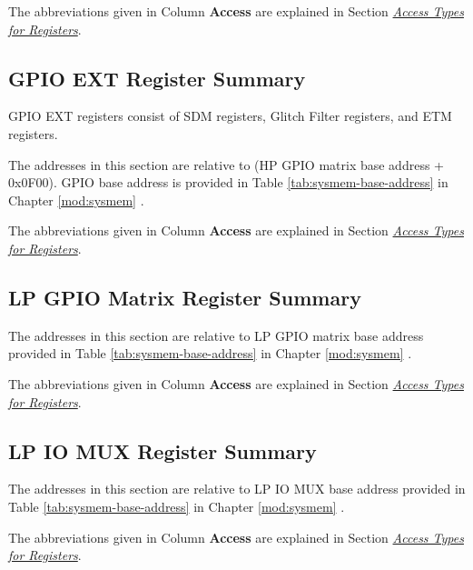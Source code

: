 \documentclass[main\_\_EN.tex]{subfiles}
\begin{document}
The abbreviations given in Column \textbf{Access} are explained in Section \hyperref[glossary-access-types]{\textit{Access Types for Registers}}.




\subsection{GPIO EXT Register Summary}

GPIO EXT registers consist of SDM registers, Glitch Filter registers, and ETM registers.

The addresses in this section are relative to (HP GPIO matrix base address + 0x0F00). GPIO base address is provided in Table \ref{tab:sysmem-base-address} in Chapter \ref{mod:sysmem} \textit{}.

The abbreviations given in Column \textbf{Access} are explained in Section \hyperref[glossary-access-types]{\textit{Access Types for Registers}}.



\subsection{LP GPIO Matrix Register Summary}
\label{sec:lp-gpio-register-summ}
The addresses in this section are relative to LP GPIO matrix base address provided in Table \ref{tab:sysmem-base-address} in Chapter \ref{mod:sysmem} \textit{}.

The abbreviations given in Column \textbf{Access} are explained in Section \hyperref[glossary-access-types]{\textit{Access Types for Registers}}.



\subsection{LP IO MUX Register Summary}
\label{sec:lp-iomux-register-summ}

The addresses in this section are relative to LP IO MUX base address provided in Table \ref{tab:sysmem-base-address} in Chapter \ref{mod:sysmem} \textit{}.

The abbreviations given in Column \textbf{Access} are explained in Section \hyperref[glossary-access-types]{\textit{Access Types for Registers}}.
\end{document}
